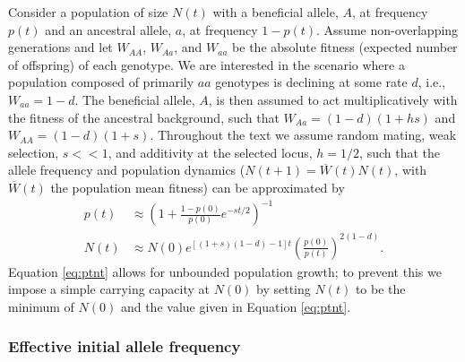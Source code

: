 \documentclass[]{article}
\begin{document}
Consider a population of size $N(t)$ with a beneficial allele, $A$, at frequency $p(t)$ and an ancestral allele, $a$, at frequency $1-p(t)$.
Assume non-overlapping generations and let $W_{AA}$, $W_{Aa}$, and $W_{aa}$ be the absolute fitness (expected number of offspring) of each genotype.
%
We are interested in the scenario where a population composed of primarily $aa$ genotypes is declining at some rate $d$, i.e., $W_{aa} = 1-d$.
The beneficial allele, $A$, is then assumed to act multiplicatively with the fitness of the ancestral background, such that $W_{Aa} = (1-d)(1+ h s)$ and $W_{AA} = (1-d)(1+s)$.
Throughout the text we assume random mating, weak selection, $s<<1$, and additivity at the selected locus, $h=1/2$, such that the allele frequency \citep[c.f., equation 5.3.12 in][]{crow1970introduction} and population dynamics ($N(t+1) = \overline{W}(t) N(t)$, with $\overline{W}(t)$ the population mean fitness) can be approximated by
\begin{equation}\label{eq:ptnt}
\begin{aligned}
p(t) &\approx \left( 1 + \frac{1-p(0)}{p(0)} e^{-s t/2} \right)^{-1}\\
N(t) &\approx N(0) e^{ \left[ (1+s)(1-d)-1\right]t} \left(\frac{p(0)}{p(t)} \right)^{2(1-d)}.
\end{aligned}
\end{equation}
Equation \ref{eq:ptnt} allows for unbounded population growth; to prevent this we impose a simple carrying capacity at $N(0)$ by setting $N(t)$ to be the minimum of $N(0)$ and the value given in Equation \ref{eq:ptnt}.

\subsubsection*{Effective initial allele frequency}
\label{sec:initial_frequency}
\end{document}
